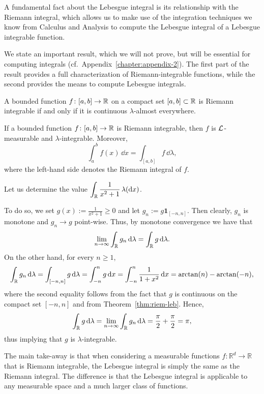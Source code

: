 A fundamental fact about the Lebesgue integral is its relationship with the Riemann integral, which allows us to make use of the integration techniques we know from Calculus and Analysis to compute the Lebesgue integral of a Lebesgue integrable function.

We state an important result, which we will not prove, but will be essential for computing integrals (cf.\ Appendix~\ref{chapter:appendix-2}). The first part of the result provides a full characterization of Riemann-integrable functions, while the second provides the means to compute Lebesgue integrals.

\begin{theorem}\label{thm:riem-leb}
	A bounded function $f\colon [a,b] \to \mathbb R$ on a compact set $[a,b]\subset\mathbb R$ is Riemann integrable if and only if it is continuous $\lambda$-almost everywhere.
	
	If a bounded function $f\colon [a,b] \to \mathbb R$ is Riemann integrable, then $f$ is $\mathcal L$-measurable and $\lambda$-integrable. Moreover,
	\[
		\int_a^b f(x) \,\dd x = \int_{[a,b]} f \,\dd \lambda,
	\]
	where the left-hand side denotes the Riemann integral of $f$.
\end{theorem}

\begin{example}\label{ex:computation_lebesgue_integral}
	Let us determine the value $\displaystyle \int_{\mathbb R} \frac{1}{x^2+1}\,\lambda(\mathrm{d} x)$.
	
	\noindent To do so, we set $g(x):= \frac{1}{x^2+1}\ge 0$ and let $g_n:= g\mathbf{1}_{[-n,n]}$. Then clearly, $g_n$ is monotone and $g_n\to g$ point-wise. Thus, by monotone convergence we have that
\[
	\lim_{n\to\infty} \int_{\mathbb R} g_n\,\mathrm{d}\lambda = \int_{\mathbb R} g\,\mathrm{d}\lambda.
\]
On the other hand, for every $n\ge 1$,
\[
	\int_{\mathbb R} g_n\,\mathrm{d}\lambda = \int_{[-n,n]} g\,\mathrm{d}\lambda = \int_{-n}^n g\,\mathrm{d} x = \int_{-n}^n \frac{1}{1+x^2}\,\mathrm{d} x = \arctan(n) - \arctan(-n),
\]
where the second equality follows from the fact that $g$ is continuous on the compact set $[-n,n]$ and from Theorem~\ref{thm:riem-leb}. Hence,
\[
	\int_{\mathbb R} g\,\mathrm{d}\lambda=\lim_{n\to\infty} \int_{\mathbb R} g_n\,\mathrm{d}\lambda = \frac{\pi}{2} + \frac{\pi}{2} = \pi,
\]
thus implying that $g$ is $\lambda$-integrable.
\end{example}

\begin{remark}
The main take-away is that when considering a measurable functions $f : \mathbb{R}^d \to \mathbb{R}$ that is Riemann integrable, the Lebesgue integral is simply the same as the Riemann integral. The difference is that the Lebesgue integral is applicable to any measurable space and a much larger class of functions.
\end{remark}


